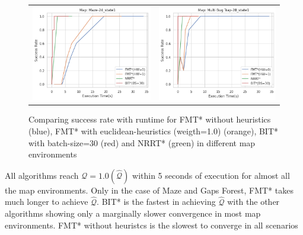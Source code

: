 \documentclass{article}
\begin{document}
\begin{figure}
{\begin{tabular}{cc}
			\includegraphics[scale=0.45]{srVet_Maze-24_state1.png} & \includegraphics[scale=0.45]{srVet_Multi Bug Trap-28_state1.png}  \\
		\end{tabular}
	}
	\caption{Comparing success rate with runtime for FMT* without heuristics (blue), FMT* with euclidean-heuristics (weigth=1.0) (orange), BIT* with batch-size=30 (red) and NRRT* (green) in different map environments}
        \label{met:srVet}
\end{figure}

All algorithms reach $\mathcal{Q}=1.0 (\hat{\mathcal{Q}})$ within 5 seconds of execution for almost all the map environments. Only in the case of Maze and Gaps Forest, FMT* takes much longer to achieve $\hat{\mathcal{Q}}$. BIT* is the fastest in achieving $\hat{\mathcal{Q}}$ with the other algorithms showing only a marginally slower convergence in most map environments. FMT* without heuristcs is the slowest to converge in all scenarios
\end{document}
